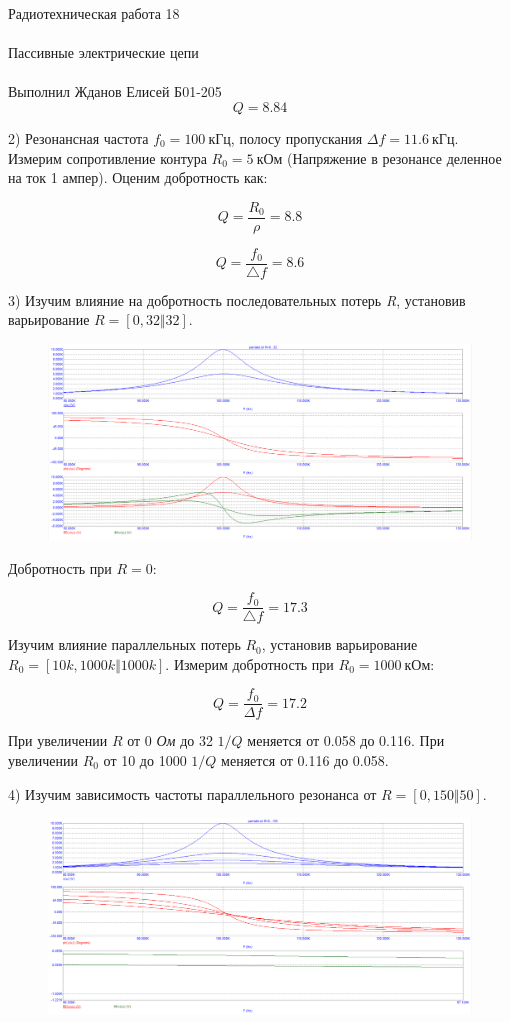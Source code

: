 \documentclass{astroedu-lab}
\begin{document}
\begin{problem}{\huge Радиотехническая работа 18\\\\Пассивные электрические цепи\\\\Выполнил Жданов Елисей Б01-205}
\[Q = 8.84\]

2) Резонансная частота $f_0 = 100 \: \text{кГц}$, полосу пропускания $\Delta f = 11.6 \: \text{кГц}$. Измерим сопротивление контура $R_0 = 5 \: \text{кОм}$ (Напряжение в резонансе деленное на ток 1 ампер). Оценим добротность как:

\[Q = \frac{R_0}{\rho} = 8.8\]

\[Q = \frac{f_0}{\triangle f} = 8.6\]

3) Изучим влияние на добротность последовательных потерь \textit{R}, установив варьирование $R = [0, 32 \Vert 32]$. 

\begin{figure}[h!]
\centering
\includegraphics[scale=0.4]{parallel_AC1.png}
\label{fig:Image1}
\end{figure} 

Добротность при $R = 0$:

\[Q = \frac{f_0}{\triangle f} = 17.3\]

Изучим влияние параллельных потерь $R_0$, установив варьирование $R_0 = [10k, 1000k \Vert 1000k]$. Измерим добротность при $R_0 = 1000 \: \text{кОм}$:

\[Q = \frac{f_0}{\Delta f} = 17.2\]

При увеличении $R$ от 0 \textit{Ом} до 32  $1/Q$ меняется от 0.058 до 0.116. При увеличении $R_0$ от 10  до 1000  $1/Q$ меняется от 0.116 до 0.058.

\newpage

4) Изучим зависимость частоты параллельного резонанса от $R = [0, 150 \Vert 50]$.

\begin{figure}[h!]
\centering
\includegraphics[scale=0.4]{parallel_AC2.png}
\label{fig:Image1}
\end{figure} 


\end{problem}
\end{document}
